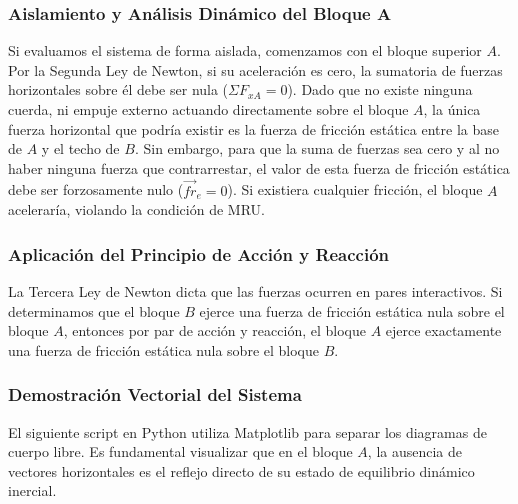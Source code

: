 \documentclass[12pt]{article}
\begin{document}
\subsubsection*{Aislamiento y Análisis Dinámico del Bloque A}
Si evaluamos el sistema de forma aislada, comenzamos con el bloque superior $A$. Por la Segunda Ley de Newton, si su aceleración es cero, la sumatoria de fuerzas horizontales sobre él debe ser nula ($\Sigma F_{xA} = 0$). 
Dado que no existe ninguna cuerda, ni empuje externo actuando directamente sobre el bloque $A$, la única fuerza horizontal que podría existir es la fuerza de fricción estática entre la base de $A$ y el techo de $B$. Sin embargo, para que la suma de fuerzas sea cero y al no haber ninguna fuerza que contrarrestar, el valor de esta fuerza de fricción estática debe ser forzosamente nulo ($\vec{fr}_e = 0$). Si existiera cualquier fricción, el bloque $A$ aceleraría, violando la condición de MRU.

\subsubsection*{Aplicación del Principio de Acción y Reacción}
La Tercera Ley de Newton dicta que las fuerzas ocurren en pares interactivos. Si determinamos que el bloque $B$ ejerce una fuerza de fricción estática nula sobre el bloque $A$, entonces por par de acción y reacción, el bloque $A$ ejerce exactamente una fuerza de fricción estática nula sobre el bloque $B$.

\subsubsection*{Demostración Vectorial del Sistema}
El siguiente script en Python utiliza Matplotlib para separar los diagramas de cuerpo libre. Es fundamental visualizar que en el bloque $A$, la ausencia de vectores horizontales es el reflejo directo de su estado de equilibrio dinámico inercial.
\end{document}
